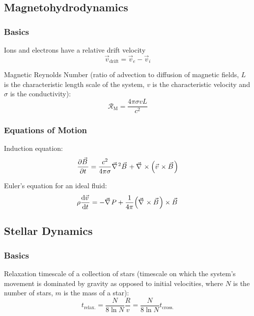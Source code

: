 	\subsection{Magnetohydrodynamics}
		\subsubsection{Basics}
			Ions and electrons have a relative drift velocity
			\begin{equation}
				\vec{v}_{\text{drift}} = \vec{v}_e - \vec{v}_i
			\end{equation}

			\noindent
			Magnetic Reynolds Number (ratio of advection to diffusion of magnetic fields, $L$ is the characteristic length scale of the system, $v$ is the characteristic velocity and $\sigma$ is the conductivity):
			\begin{equation}
				\mathcal{R}_\text{M} = \frac{4\pi\sigma v L}{c^2}
			\end{equation}

		\subsubsection{Equations of Motion}
			Induction equation:
			\begin{equation}
				\pdv{\vec{B}}{t} = \frac{c^2}{4\pi\sigma} \Nabla^2 \vec{B} + \Nabla\times\qty(\vec{v}\times\vec{B})
			\end{equation}

			\noindent
			Euler's equation for an ideal fluid:
			\begin{equation}
				\rho \dv{\vec{v}}{t} = - \Nabla P + \frac{1}{4\pi}\qty(\Nabla\times\vec{B})\times\vec{B}
			\end{equation}


	\subsection{Stellar Dynamics}
		\subsubsection{Basics}
			Relaxation timescale of a collection of stars (timescale on which the system's movement is dominated by gravity as opposed to initial velocities, where $N$ is the number of stars, $m$ is the mass of a star):
			\begin{equation}
				t_{\text{relax.}} = \frac{N}{8\ln N} \frac{R}{v} = \frac{N}{8\ln N} t_{\text{cross.}}
			\end{equation}



